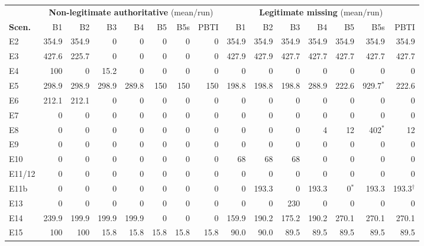 \begin{tabular}{lrrrrrrrrrrrrrr}
\toprule
& \multicolumn{7}{c}{\textbf{Non-legitimate authoritative} (mean/run)} & \multicolumn{7}{c}{\textbf{Legitimate missing} (mean/run)}\\
\cmidrule(lr){2-8}\cmidrule(lr){9-15}
\textbf{Scen.} & B1 & B2 & B3 & B4 & B5 & B5s & PBTI & B1 & B2 & B3 & B4 & B5 & B5s & PBTI\\
\midrule
E2 & 354.9 & 354.9 & 0 & 0 & 0 & 0 & 0 & 354.9 & 354.9 & 354.9 & 354.9 & 354.9 & 354.9 & 354.9\\
E3 & 427.6 & 225.7 & 0 & 0 & 0 & 0 & 0 & 427.9 & 427.9 & 427.7 & 427.7 & 427.7 & 427.7 & 427.7\\
E4 & 100 & 0 & 15.2 & 0 & 0 & 0 & 0 & 0 & 0 & 0 & 0 & 0 & 0 & 0\\
E5 & 298.9 & 298.9 & 298.9 & 289.8 & 150 & 150 & 150 & 198.8 & 198.8 & 198.8 & 288.9 & 222.6 & 929.7$^{*}$ & 222.6\\
E6 & 212.1 & 212.1 & 0 & 0 & 0 & 0 & 0 & 0 & 0 & 0 & 0 & 0 & 0 & 0\\
E7 & 0 & 0 & 0 & 0 & 0 & 0 & 0 & 0 & 0 & 0 & 0 & 0 & 0 & 0\\
E8 & 0 & 0 & 0 & 0 & 0 & 0 & 0 & 0 & 0 & 0 & 4 & 12 & 402$^{*}$ & 12\\
E9 & 0 & 0 & 0 & 0 & 0 & 0 & 0 & 0 & 0 & 0 & 0 & 0 & 0 & 0\\
E10 & 0 & 0 & 0 & 0 & 0 & 0 & 0 & 68 & 68 & 68 & 0 & 0 & 0 & 0\\
E11/12 & 0 & 0 & 0 & 0 & 0 & 0 & 0 & 0 & 0 & 0 & 0 & 0 & 0 & 0\\
E11b & 0 & 0 & 0 & 0 & 0 & 0 & 0 & 0 & 193.3 & 0 & 193.3 & 0$^{*}$ & 193.3 & 193.3$^{\dagger}$\\
E13 & 0 & 0 & 0 & 0 & 0 & 0 & 0 & 0 & 0 & 230 & 0 & 0 & 0 & 0\\
E14 & 239.9 & 199.9 & 199.9 & 199.9 & 0 & 0 & 0 & 159.9 & 190.2 & 175.2 & 190.2 & 270.1 & 270.1 & 270.1\\
E15 & 100 & 100 & 15.8 & 15.8 & 15.8 & 15.8 & 15.8 & 90.0 & 90.0 & 89.5 & 89.5 & 89.5 & 89.5 & 89.5\\
\bottomrule
\end{tabular}